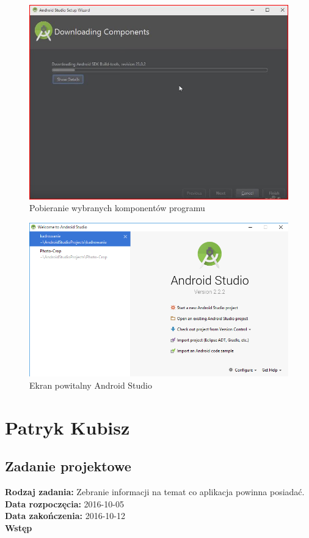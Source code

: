 \begin{figure}[h!]
\centering
\includegraphics[width=0.5\linewidth]{fig/i5}
\caption{Pobieranie wybranych komponentów programu}
\label{fig:15}
\end{figure}

\begin{figure}[h!]
\centering
\includegraphics[width=0.7\linewidth]{fig/i6}
\caption{Ekran powitalny Android Studio}
\label{fig:16}
\end{figure}




\chapter {Patryk Kubisz}
\section{Zadanie projektowe}

\noindent\textbf{Rodzaj zadania:} Zebranie informacji na temat co aplikacja powinna posiadać.\\

\noindent\textbf{Data rozpoczęcia:} 2016-10-05\\

\noindent\textbf{Data zakończenia:} 2016-10-12\\

\noindent\textbf{Wstęp}\\

